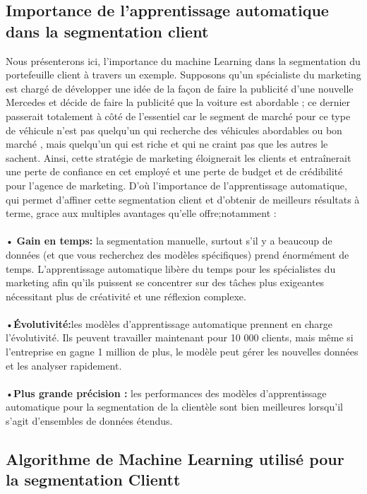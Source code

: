 \documentclass{article}
\begin{document}
\subsection{Importance de l'apprentissage automatique dans la segmentation client}
Nous présenterons ici, l’importance du machine Learning dans la segmentation du portefeuille client à travers un exemple. Supposons qu’un spécialiste du marketing est chargé de développer une idée de la façon de faire la publicité d'une nouvelle Mercedes et décide de faire la publicité que la voiture est abordable ; ce dernier  passerait totalement à côté de l'essentiel car  le segment de marché pour ce type de véhicule n'est pas quelqu'un qui recherche des véhicules  abordables  ou  bon marché , mais quelqu'un qui est riche et qui ne craint pas que les autres le sachent. 
Ainsi, cette stratégie de marketing éloignerait les clients et entraînerait une perte de confiance en cet employé et une perte de budget et de crédibilité pour l'agence de marketing.  D’où l’importance de l’apprentissage automatique, qui permet d’affiner cette segmentation client et d’obtenir de meilleurs résultats à terme, grace aux multiples avantages qu'elle offre;notamment :\\
\\•	 \textbf{Gain en temps:} la segmentation manuelle, surtout s'il y a beaucoup de données (et que vous recherchez des modèles spécifiques) prend énormément de temps. L'apprentissage automatique libère du temps pour les spécialistes du marketing afin qu'ils puissent se concentrer sur des tâches plus exigeantes nécessitant plus de créativité et une réflexion complexe.\\
\\•\textbf{Évolutivité:}les modèles d'apprentissage automatique prennent en charge l'évolutivité. Ils peuvent travailler maintenant pour 10 000 clients, mais même si l'entreprise en gagne 1 million de plus, le modèle peut gérer les nouvelles données et les analyser rapidement.\\
\\•\textbf{Plus grande précision :} les performances des modèles d'apprentissage automatique pour la segmentation de la clientèle sont bien meilleures lorsqu'il s'agit d'ensembles de données étendus.
\subsection{Algorithme de Machine Learning utilisé pour la segmentation Clientt}
\end{document}
